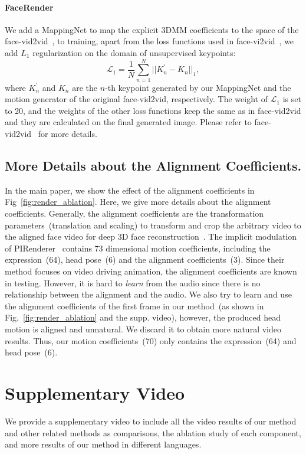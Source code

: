 \paragraph{FaceRender}
We add a MappingNet to map the explicit 3DMM coefficients to the space of the face-vid2vid~\cite{facevid2vid}, to training, apart from the loss functions used in face-vi2vid~\cite{facevid2vid}, we add $L_1$ regularization on the domain of unsupervised keypoints:
\begin{equation}
\mathcal{L}_{1} = \frac{1}{N} \sum_{n=1}^{N}||K^{\prime}_n - K_n ||_{1},
\end{equation}
where $K^{\prime}_n$ and $K_n $ are the $n$-th keypoint generated by our MappingNet and the motion generator of the original face-vid2vid, respectively. The weight of $\mathcal{L}_{1}$ is set to 20, and the weights of the other loss functions keep the same as in face-vid2vid and they are calculated on the final generated image. Please refer to face-vid2vid~\cite{facevid2vid}
for more details.


\subsection{More Details about the Alignment Coefficients.}
\label{supp:align}
In the main paper, we show the effect of the alignment coefficients in Fig~\ref{fig:render_ablation}. Here, we give more details about the alignment coefficients. Generally, the alignment coefficients are the transformation parameters~(translation and scaling) to transform and crop the arbitrary video to the aligned face video for deep 3D face reconstruction~\cite{deng2019accurate}. The implicit modulation of PIRenderer~\cite{ren2021pirenderer} contains 73 dimensional motion coefficients, including the expression~(64), head pose~(6) and the alignment coefficients~(3). Since their method focuses on video driving animation, the alignment coefficients are known in testing. However, it is hard to \textit{learn} from the audio since there is no relationship between the alignment and the audio. We also try to learn and use the alignment coefficients of the first frame in our method~(as shown in Fig.~\ref{fig:render_ablation} and the supp. video), however, the produced head motion is aligned and unnatural. We discard it to obtain more natural video results. Thus, our motion coefficients~(70) only contains the expression~(64) and head pose~(6).

\section{Supplementary Video}
We provide a supplementary video to include all the video results of our method and other related methods as comparisons, the ablation study of each component, and more results of our method in different languages.

    